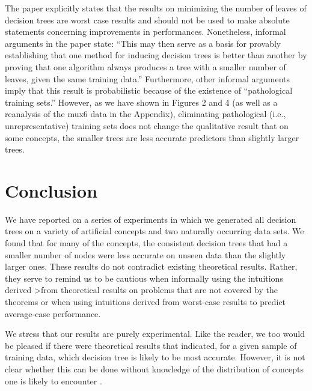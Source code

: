 The \cite{fayyad90} paper explicitly states that the results on
minimizing the number of leaves of decision trees are worst case
results and should not be used to make absolute statements concerning
improvements in performances.  Nonetheless, informal arguments in
the paper state: ``This may then serve as a basis for provably
establishing that one method for inducing
decision trees is better than another by proving that one algorithm
always produces a tree with a smaller number of leaves, given the same
training data.'' Furthermore, other informal arguments imply
that this result is probabilistic because of the existence of
``pathological training sets.''  However, as we have shown in 
Figures 2 and 4 (as well as a reanalysis of the mux6 data in the 
Appendix), eliminating pathological (i.e., unrepresentative) training 
sets does not change the qualitative result that on some concepts, the 
smaller trees are less accurate predictors than slightly larger trees.

\section{Conclusion}

We have reported on a series of experiments in which we generated all
decision trees on a variety of artificial concepts and two naturally
occurring data sets. We found that for many of the concepts, the
consistent decision trees that had a smaller number of nodes were less
accurate on unseen data than the slightly larger ones.  These results do
not contradict existing theoretical results.  Rather, they serve to
remind us to be cautious when informally using the intuitions derived
>from theoretical results on problems that are not covered by the
theorems or when using intuitions derived from worst-case results to
predict average-case performance.

We stress that our results are purely experimental.  Like the
reader, we too would be pleased if there were theoretical results that
indicated, for a given sample of training data, which decision tree is
likely to be most accurate.  However, it is not clear whether this can
be done without knowledge of the distribution of concepts one is
likely to encounter \cite{schaffer94}.  

